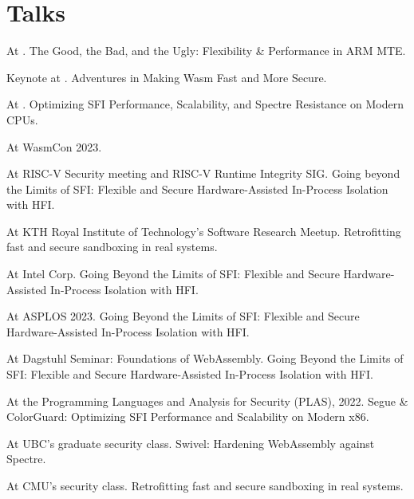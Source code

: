 \section{Talks}

{ At . The Good, the Bad, and the Ugly: Flexibility \& Performance in ARM MTE.}

{ Keynote at . Adventures in Making Wasm Fast and More Secure.}

{ At . Optimizing SFI Performance, Scalability, and Spectre
Resistance on Modern CPUs.}

{ At WasmCon 2023. }

{ At RISC-V Security meeting and RISC-V Runtime Integrity SIG. Going beyond the
Limits of SFI: Flexible and Secure Hardware-Assisted In-Process Isolation with
HFI. }

{ At KTH Royal Institute of Technology's Software Research Meetup.
Retrofitting fast and secure sandboxing in real systems.
}

{ At Intel Corp. Going Beyond the Limits of SFI: Flexible and Secure
Hardware-Assisted In-Process Isolation with HFI. }

{ At ASPLOS 2023. Going Beyond the Limits of SFI: Flexible and Secure
Hardware-Assisted In-Process Isolation with HFI. }

{ At Dagstuhl Seminar:
{Foundations of WebAssembly}. Going Beyond the Limits of SFI: Flexible and
Secure Hardware-Assisted In-Process Isolation with HFI. }

{ At the Programming Languages and Analysis for Security (PLAS), 2022. Segue \&
ColorGuard: Optimizing SFI Performance and Scalability on Modern x86. }

{ At UBC's graduate security class. Swivel: Hardening WebAssembly against
Spectre. }

{ At CMU's security class. Retrofitting fast and secure sandboxing in real
systems. }

